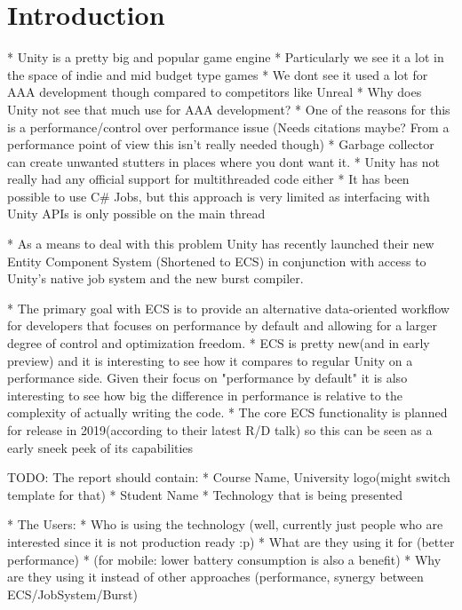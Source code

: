 \chapter{Introduction}
* Unity is a pretty big and popular game engine
* Particularly we see it a lot in the space of indie and mid budget type games
* We dont see it used a lot for AAA development though compared to competitors like Unreal 
* Why does Unity not see that much use for AAA development?
   * One of the reasons for this is a performance/control over performance issue (Needs citations maybe? From a performance point of view this isn't really needed though)
      * Garbage collector can create unwanted stutters in places where you dont want it.
      * Unity has not really had any official support for multithreaded code either
         * It has been possible to use C\# Jobs, but this approach is very limited as interfacing with Unity APIs is only possible on the main thread

* As a means to deal with this problem Unity has recently launched their new Entity Component System (Shortened to ECS) in conjunction with access to Unity's native job system and the new burst compiler. 
   
* The primary goal with ECS is to provide an alternative data-oriented workflow for developers that focuses on performance by default and allowing for a larger degree of control and optimization freedom.
* ECS is pretty new(and in early preview) and it is interesting to see how it compares to regular Unity on a performance side. Given their focus on "performance by default" it is also interesting to see how big the difference in performance is relative to the complexity of actually writing the code.
* The core ECS functionality is planned for release in 2019(according to their latest R/D talk) so this can be seen as a early sneek peek of its capabilities

TODO: 
The report should contain:
* Course Name, University logo(might switch template for that)
* Student Name
* Technology that is being presented

* The Users:
  * Who is using the technology (well, currently just people who are interested since it is not production ready :p)
  * What are they using it for (better performance)
     * (for mobile: lower battery consumption is also a benefit)
  * Why are they using it instead of other approaches (performance, synergy between ECS/JobSystem/Burst)
